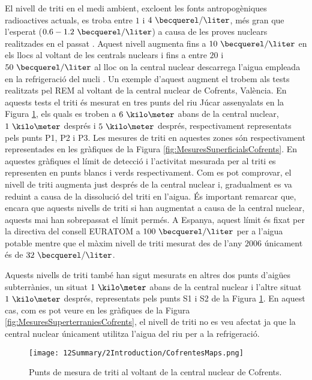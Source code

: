 El nivell de triti en el medi ambient, excloent les fonts antropogèniques radioactives actuals, es troba entre $1$ i $4~\becquerel/\liter$, més gran que l'esperat ($0.6-1.2~\becquerel/\liter$) a causa de les proves nuclears realitzades en el passat \cite{FranceTritiumEnvironment}. Aquest nivell augmenta fins a $10~\becquerel/\liter$ en els llocs al voltant de les centrals nuclears i fins a entre $20$ i $50~\becquerel/\liter$ al lloc on la central nuclear descarrega l'aigua empleada en la refrigeració del nucli \cite{FranceTritiumEnvironment}. Un exemple d'aquest augment el trobem als tests realitzats pel REM al voltant de la central nuclear de Cofrents, València. En aquests tests el triti és mesurat en tres punts del riu Júcar assenyalats en la Figura \ref{fig:PuntsMesuraTritiCofrents}, els quals es troben a $6~\kilo\meter$ abans de la central nuclear, $1~\kilo\meter$ després i $5~\kilo\meter$ després, respectivament representats pels punts P1, P2 i P3. Les mesures de triti en aquestes zones són respectivament representades en les gràfiques de la Figura \ref{fig:MesuresSuperficialsCofrents}. En aquestes gràfiques el límit de detecció i l'activitat mesurada per al triti es representen en punts blancs i verds respectivament. Com es pot comprovar, el nivell de triti augmenta just després de la central nuclear i, gradualment es va reduint a causa de la dissolució del triti en l'aigua. És important remarcar que, encara que aquests nivells de triti si han augmentat a causa de la central nuclear, aquests mai han sobrepassat el límit permés. A Espanya, aquest límit és fixat per la directiva del consell EURATOM a $100~\becquerel/\liter$ per a l'aigua potable \cite{100BqL} mentre que el màxim nivell de triti mesurat des de l'any $2006$ únicament és de $32~\becquerel/\liter$.

Aquests nivells de triti també han sigut mesurats en altres dos punts d'aigües subterrànies, un situat $1~\kilo\meter$ abans de la central nuclear i l'altre situat $1~\kilo\meter$ després, representats pels punts S1 i S2 de la Figura \ref{fig:PuntsMesuraTritiCofrents}. En aquest cas, com es pot veure en les gràfiques de la Figura \ref{fig:MesuresSuperterraniesCofrents}, el nivell de triti no es veu afectat ja que la central nuclear únicament utilitza l'aigua del riu per a la refrigeració.

\begin{figure}[hbtp]
\texttt{[image: 12Summary/2Introduction/CofrentesMaps.png]}
\centering
\caption{Punts de mesura de triti al voltant de la central nuclear de Cofrents.\label{fig:PuntsMesuraTritiCofrents}}
\end{figure}

